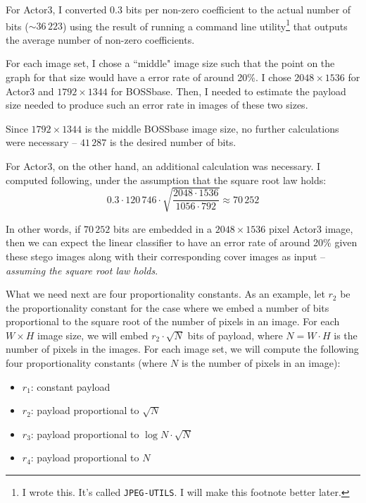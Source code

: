 \documentclass[11pt,a4paper,twoside,openright]{report}
\begin{document}
For Actor3, I converted 0.3 bits per non-zero coefficient to the actual number of bits ($\sim 36\,223$) using the result of running a command line utility\footnote{I wrote this. It's called \texttt{JPEG-UTILS}. I will make this footnote better later.} that outputs the average number of non-zero coefficients.

For each image set, I chose a ``middle" image size such that the point on the graph for that size would have a error rate of around 20\%. I chose $2048\times1536$ for Actor3 and $1792\times1344$ for BOSSbase. Then, I needed to estimate the payload size needed to produce such an error rate in images of these two sizes.

Since $1792\times1344$ is the middle BOSSbase image size, no further calculations were necessary -- $41\,287$ is the desired number of bits.

For Actor3, on the other hand, an additional calculation was necessary. I computed following, under the assumption that the square root law holds:
\begin{equation}
    0.3 \cdot 120\,746 \cdot \sqrt{\frac{2048\cdot1536}{1056\cdot792}} \approx 70\,252
\end{equation}

In other words, if $70\,252$ bits are embedded in a $2048\times1536$ pixel Actor3 image, then we can expect the linear classifier to have an error rate of around 20\% given these stego images along with their corresponding cover images as input -- \textit{assuming the square root law holds}.

What we need next are four proportionality constants. As an example, let $r_2$ be the proportionality constant for the case where we embed a number of bits proportional to the square root of the number of pixels in an image. For each $W \times H$ image size, we will embed $r_2 \cdot \sqrt{N}$ bits of payload, where $N = W \cdot H$ is the number of pixels in the images. For each image set, we will compute the following four proportionality constants (where $N$ is the number of pixels in an image):
\begin{itemize}
    \item $r_1$: constant payload
    \item $r_2$: payload proportional to $\sqrt{N}$
    \item $r_3$: payload proportional to $\log{N} \cdot \sqrt{N}$
    \item $r_4$: payload proportional to $N$
\end{itemize}
\end{document}

